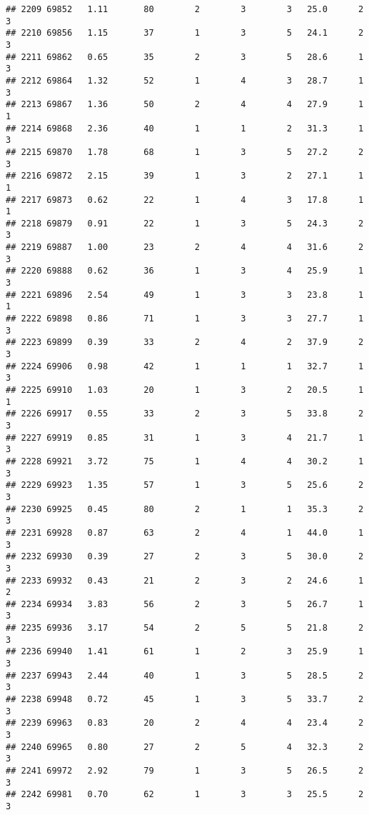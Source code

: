 \documentclass[
]{article}
\begin{document}
\begin{verbatim}
## 2209 69852   1.11       80        2        3        3   25.0      2      3
## 2210 69856   1.15       37        1        3        5   24.1      2      3
## 2211 69862   0.65       35        2        3        5   28.6      1      3
## 2212 69864   1.32       52        1        4        3   28.7      1      3
## 2213 69867   1.36       50        2        4        4   27.9      1      1
## 2214 69868   2.36       40        1        1        2   31.3      1      3
## 2215 69870   1.78       68        1        3        5   27.2      2      3
## 2216 69872   2.15       39        1        3        2   27.1      1      1
## 2217 69873   0.62       22        1        4        3   17.8      1      1
## 2218 69879   0.91       22        1        3        5   24.3      2      3
## 2219 69887   1.00       23        2        4        4   31.6      2      3
## 2220 69888   0.62       36        1        3        4   25.9      1      3
## 2221 69896   2.54       49        1        3        3   23.8      1      1
## 2222 69898   0.86       71        1        3        3   27.7      1      3
## 2223 69899   0.39       33        2        4        2   37.9      2      3
## 2224 69906   0.98       42        1        1        1   32.7      1      3
## 2225 69910   1.03       20        1        3        2   20.5      1      1
## 2226 69917   0.55       33        2        3        5   33.8      2      3
## 2227 69919   0.85       31        1        3        4   21.7      1      3
## 2228 69921   3.72       75        1        4        4   30.2      1      3
## 2229 69923   1.35       57        1        3        5   25.6      2      3
## 2230 69925   0.45       80        2        1        1   35.3      2      3
## 2231 69928   0.87       63        2        4        1   44.0      1      3
## 2232 69930   0.39       27        2        3        5   30.0      2      3
## 2233 69932   0.43       21        2        3        2   24.6      1      2
## 2234 69934   3.83       56        2        3        5   26.7      1      3
## 2235 69936   3.17       54        2        5        5   21.8      2      3
## 2236 69940   1.41       61        1        2        3   25.9      1      3
## 2237 69943   2.44       40        1        3        5   28.5      2      3
## 2238 69948   0.72       45        1        3        5   33.7      2      3
## 2239 69963   0.83       20        2        4        4   23.4      2      3
## 2240 69965   0.80       27        2        5        4   32.3      2      3
## 2241 69972   2.92       79        1        3        5   26.5      2      3
## 2242 69981   0.70       62        1        3        3   25.5      2      3

\end{verbatim}
\end{document}
